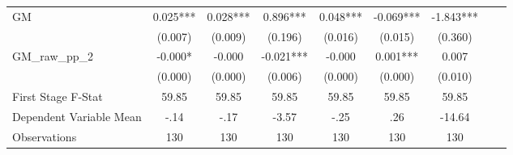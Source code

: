 \begin{tabular}{l*{8}{c}}
GM              &    0.025***&    0.028***&    0.896***&    0.048***&   -0.069***&   -1.843***\\
                &  (0.007)   &  (0.009)   &  (0.196)   &  (0.016)   &  (0.015)   &  (0.360)   \\
\addlinespace
GM\_raw\_pp\_2     &   -0.000*  &   -0.000   &   -0.021***&   -0.000   &    0.001***&    0.007   \\
                &  (0.000)   &  (0.000)   &  (0.006)   &  (0.000)   &  (0.000)   &  (0.010)   \\
\midrule
First Stage F-Stat&    59.85   &    59.85   &    59.85   &    59.85   &    59.85   &    59.85   \\
Dependent Variable Mean&     -.14   &     -.17   &    -3.57   &     -.25   &      .26   &   -14.64   \\
Observations    &      130   &      130   &      130   &      130   &      130   &      130   \\
       \bottomrule \end{tabular}
